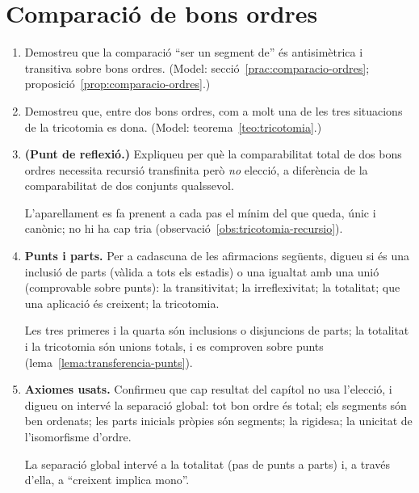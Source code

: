 \section{Comparació de bons ordres}

\begin{enumerate}[resume]
  \item Demostreu que la comparació \enquote{ser un segment de} és antisimètrica i transitiva sobre bons ordres. (Model: secció~\ref{prac:comparacio-ordres}; proposició~\ref{prop:comparacio-ordres}.)

  \item Demostreu que, entre dos bons ordres, com a molt una de les tres situacions de la tricotomia es dona. (Model: teorema~\ref{teo:tricotomia}.)

  \item \textbf{(Punt de reflexió.)} Expliqueu per què la comparabilitat total de dos bons ordres necessita recursió transfinita però \emph{no} elecció, a diferència de la comparabilitat de dos conjunts qualssevol. \begin{indicacio}L'aparellament es fa prenent a cada pas el mínim del que queda, únic i canònic; no hi ha cap tria (observació~\ref{obs:tricotomia-recursio}).\end{indicacio}

  \item \textbf{Punts i parts.} Per a cadascuna de les afirmacions següents, digueu si és una inclusió de parts (vàlida a tots els estadis) o una igualtat amb una unió (comprovable sobre punts): la transitivitat; la irreflexivitat; la totalitat; que una aplicació és creixent; la tricotomia. \begin{indicacio}Les tres primeres i la quarta són inclusions o disjuncions de parts; la totalitat i la tricotomia són unions totals, i es comproven sobre punts (lema~\ref{lema:transferencia-punts}).\end{indicacio}

  \item \textbf{Axiomes usats.} Confirmeu que cap resultat del capítol no usa l'elecció, i digueu on intervé la separació global: tot bon ordre és total; els segments són ben ordenats; les parts inicials pròpies són segments; la rigidesa; la unicitat de l'isomorfisme d'ordre. \begin{indicacio}La separació global intervé a la totalitat (pas de punts a parts) i, a través d'ella, a \enquote{creixent implica mono}.\end{indicacio}
\end{enumerate}
